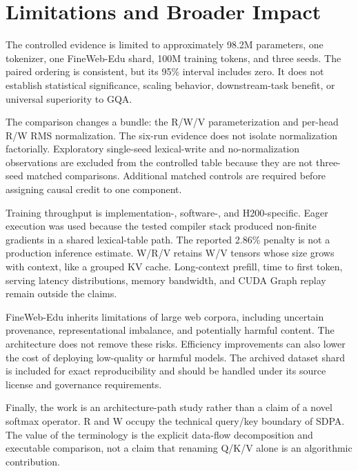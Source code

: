 \section{Limitations and Broader Impact}

The controlled evidence is limited to approximately 98.2M parameters, one tokenizer, one FineWeb-Edu shard, 100M training tokens, and three seeds. The paired ordering is consistent, but its 95\% interval includes zero. It does not establish statistical significance, scaling behavior, downstream-task benefit, or universal superiority to GQA.

The comparison changes a bundle: the R/W/V parameterization and per-head R/W RMS normalization. The six-run evidence does not isolate normalization factorially. Exploratory single-seed lexical-write and no-normalization observations are excluded from the controlled table because they are not three-seed matched comparisons. Additional matched controls are required before assigning causal credit to one component.

Training throughput is implementation-, software-, and H200-specific. Eager execution was used because the tested compiler stack produced non-finite gradients in a shared lexical-table path. The reported 2.86\% penalty is not a production inference estimate. W/R/V retains W/V tensors whose size grows with context, like a grouped KV cache. Long-context prefill, time to first token, serving latency distributions, memory bandwidth, and CUDA Graph replay remain outside the claims.

FineWeb-Edu inherits limitations of large web corpora, including uncertain provenance, representational imbalance, and potentially harmful content. The architecture does not remove these risks. Efficiency improvements can also lower the cost of deploying low-quality or harmful models. The archived dataset shard is included for exact reproducibility and should be handled under its source license and governance requirements.

Finally, the work is an architecture-path study rather than a claim of a novel softmax operator. R and W occupy the technical query/key boundary of SDPA. The value of the terminology is the explicit data-flow decomposition and executable comparison, not a claim that renaming Q/K/V alone is an algorithmic contribution.